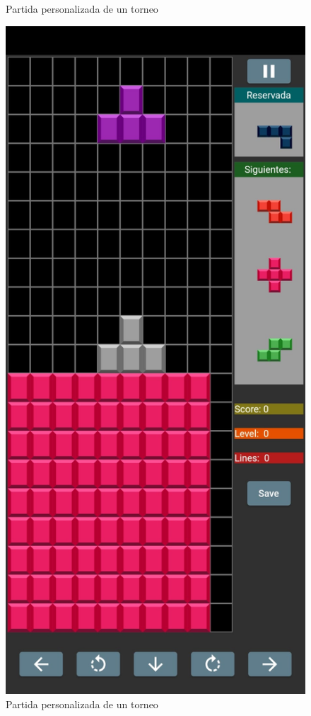 \documentclass{article}
\begin{document}
\begin{figure}[H]
  \caption{Partida personalizada de un torneo} 
\end{figure}

\begin{figure}[H]
  \includegraphics[width=\textwidth]{imagenes/piezasRosas.jpeg}
  \caption{Partida personalizada de un torneo} 
\end{figure}
\end{document}
